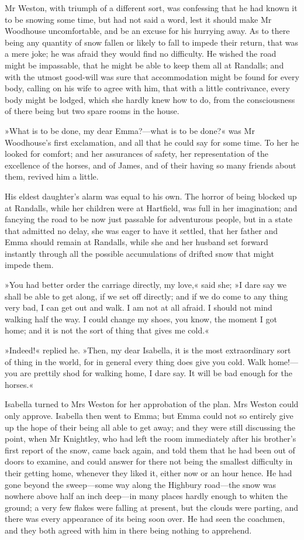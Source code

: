 Mr Weston, with triumph of a different sort, was confessing that he had known it to be snowing some time, but had not said a word, lest it should make Mr Woodhouse uncomfortable, and be an excuse for his hurrying away. As to there being any quantity of snow fallen or likely to fall to impede their return, that was a mere joke; he was afraid they would find no difficulty. He wished the road might be impassable, that he might be able to keep them all at Randalls; and with the utmost good-will was sure that accommodation might be found for every body, calling on his wife to agree with him, that with a little contrivance, every body might be lodged, which she hardly knew how to do, from the consciousness of there being but two spare rooms in the house.

»What is to be done, my dear Emma?—what is to be done?« was Mr Woodhouse's first exclamation, and all that he could say for some time. To her he looked for comfort; and her assurances of safety, her representation of the excellence of the horses, and of James, and of their having so many friends about them, revived him a little.

His eldest daughter's alarm was equal to his own. The horror of being blocked up at Randalls, while her children were at Hartfield, was full in her imagination; and fancying the road to be now just passable for adventurous people, but in a state that admitted no delay, she was eager to have it settled, that her father and Emma should remain at Randalls, while she and her husband set forward instantly through all the possible accumulations of drifted snow that might impede them.

»You had better order the carriage directly, my love,« said she; »I dare say we shall be able to get along, if we set off directly; and if we do come to any thing very bad, I can get out and walk. I am not at all afraid. I should not mind walking half the way. I could change my shoes, you know, the moment I got home; and it is not the sort of thing that gives me cold.«

»Indeed!« replied he. »Then, my dear Isabella, it is the most extraordinary sort of thing in the world, for in general every thing does give you cold. Walk home!—you are prettily shod for walking home, I dare say. It will be bad enough for the horses.«

Isabella turned to Mrs Weston for her approbation of the plan. Mrs Weston could only approve. Isabella then went to Emma; but Emma could not so entirely give up the hope of their being all able to get away; and they were still discussing the point, when Mr Knightley, who had left the room immediately after his brother's first report of the snow, came back again, and told them that he had been out of doors to examine, and could answer for there not being the smallest difficulty in their getting home, whenever they liked it, either now or an hour hence. He had gone beyond the sweep—some way along the Highbury road—the snow was nowhere above half an inch deep—in many places hardly enough to whiten the ground; a very few flakes were falling at present, but the clouds were parting, and there was every appearance of its being soon over. He had seen the coachmen, and they both agreed with him in there being nothing to apprehend.

